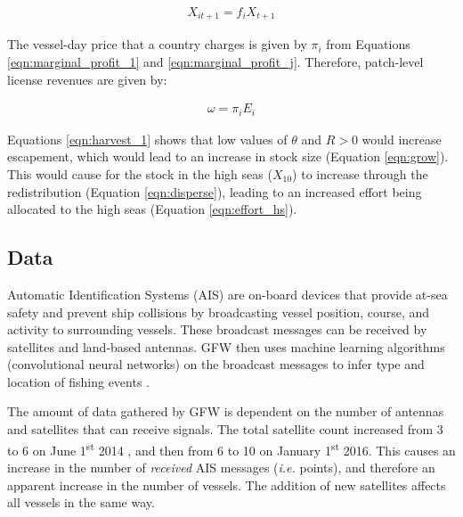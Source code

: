 \documentclass[9p,twocolumn,twoside,lineno]{pnas-new}
\begin{document}
\begin{scriptsize}
\begin{figure}[H]	
	\begin{align}
	X_{it+1} = f_iX_{t+1}
	\label{eqn:disperse}
	\end{align}
\end{figure}

The vessel-day price that a country charges is given by $\pi_i$ from Equations \ref{eqn:marginal_profit_1} and \ref{eqn:marginal_profit_j}. Therefore, patch-level license revenues are given by:

\begin{figure}[H]	
	\begin{align}
	\omega = \pi_iE_i
	\label{eqn:license_revenue}
	\end{align}
\end{figure}

Equations \ref{eqn:harvest_1} shows that low values of $\theta$ and $R > 0$ would increase escapement, which would lead to an increase in stock size (Equation \ref{eqn:grow}). This would cause for the stock in the high seas ($X_{10}$) to increase through the redistribution (Equation \ref{eqn:disperse}), leading to an increased effort being allocated to the high seas (Equation \ref{eqn:effort_hs}).

\subsection{Data}

Automatic Identification Systems (AIS) are on-board devices that provide at-sea safety and prevent ship collisions by broadcasting vessel position, course, and activity to surrounding vessels. These broadcast messages can be received by satellites and land-based antennas. GFW then uses machine learning algorithms (convolutional neural networks) on the broadcast messages to infer type and location of fishing events \citep{kroodsma_2018}.

The amount of data gathered by GFW is dependent on the number of antennas and satellites that can receive signals. The total satellite count increased from 3 to 6 on June 1\textsuperscript{st} 2014 , and then from 6 to 10 on January 1\textsuperscript{st} 2016. This causes an increase in the number of \emph{received} AIS messages (\emph{i.e.} points), and therefore an apparent increase in the number of vessels. The addition of new satellites affects all vessels in the same way.


\end{scriptsize}
\end{document}

